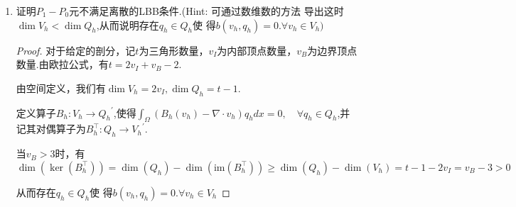 \documentclass[12pt,a4paper]{article}
\begin{document}
\begin{enumerate}
\begin{proof}
		\end{proof}
		\item 证明$P_1-P_0$元不满足离散的LBB条件.(Hint: 可通过数维数的方法
		导出这时$\dim V_h < \dim Q_h$,从而说明存在$q_h\in Q_h$使
		得$b(v_h,q_h)=0.\forall v_h\in V_h)$	
		
		\begin{proof}
			对于给定的剖分，记$t$为三角形数量，$v_I$为内部顶点数量，$v_B$为边界顶点数量.由欧拉公式，有$t=2v_I+v_B-2$.
			
			由空间定义，我们有$\dim V_h = 2 v_I, \dim Q_h = t-1$.
			
			定义算子$B_h:V_h\rightarrow {Q_h}^\prime$,使得$\int_{\Omega}(B_h({v}_h)-\nabla\cdot{v}_h)q_h {d}x=0, \quad \forall q_h \in Q_h$,并记其对偶算子为$B_h^\top:Q_h \rightarrow {V_h}^\prime$.
			
			当$v_B > 3$时，有
			$$\dim(\ker(B_h^\top)) =\dim(Q_{h})-\dim(\mathrm{im}(B_{h}^{\top}))\geq\dim(Q_{h})-\dim(V_{h})=t-1-2v_I=v_B-3>0$$
			
			从而存在$q_h\in Q_h$使
			得$b(v_h,q_h)=0.\forall v_h\in V_h$	
		\end{proof}
		
	\end{enumerate}
	
\end{document}
